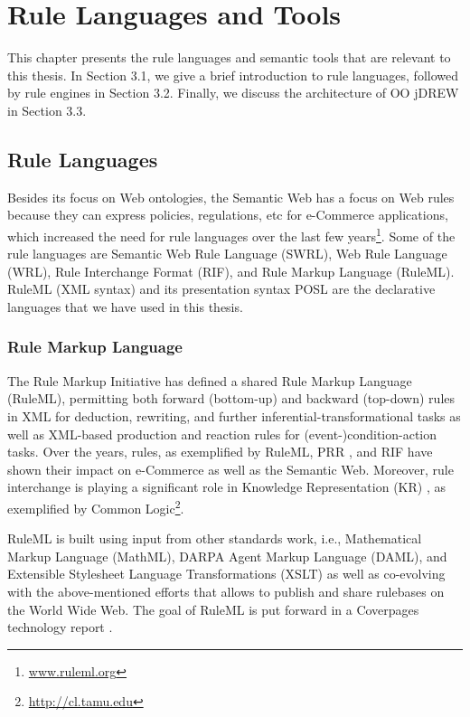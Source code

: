 \chapter{Rule Languages and Tools}

\hspace{0.3in}This chapter presents the rule languages and semantic tools that are relevant to
this thesis. In Section 3.1, we give a brief introduction to rule languages, 
followed by rule engines in Section 3.2. Finally, we discuss the architecture of OO jDREW in Section 3.3.

\section{Rule Languages}

\hspace{0.3in}Besides its focus on Web ontologies, the Semantic Web has a focus on Web rules because they can express policies, regulations, etc for e-Commerce applications, which increased the need for rule languages over the last few years\footnote{\href{www.ruleml.org}{\url{www.ruleml.org}}}. Some of the rule languages are Semantic Web Rule Language (SWRL), Web Rule Language (WRL), Rule Interchange Format (RIF), and Rule
Markup Language (RuleML). RuleML (XML syntax) and its presentation syntax POSL \cite{HB:05} are the declarative languages that we have used in this thesis.

\subsection{Rule Markup Language}

\hspace{0.3in}The Rule Markup Initiative has defined a shared Rule Markup Language (RuleML), permitting both forward (bottom-up) and backward (top-down) rules in XML for deduction, rewriting, and further inferential-transformational tasks as well as XML-based production and reaction rules for (event-)condition-action tasks. Over the years, rules, as exemplified by RuleML, PRR \cite{DBLP:conf/w3c/TabetWSVJMPFD05}, and RIF \cite{Boley:08:RBL} have shown their impact on e-Commerce as well as the Semantic Web. Moreover, rule interchange is playing a significant role in Knowledge Representation (KR) \cite{HB:01}, as exemplified by Common Logic\footnote{\href{http://cl.tamu.edu}{\url{http://cl.tamu.edu}}}.

\hspace{0.3in}RuleML is built using input from other standards work, i.e.,  Mathematical Markup Language (MathML),
DARPA Agent Markup Language (DAML), and Extensible Stylesheet Language Transformations (XSLT) as well as co-evolving with the above-mentioned efforts that allows to publish and share rulebases on the World Wide Web. The goal of RuleML is put forward in a Coverpages technology report \cite{Tech:06}.


